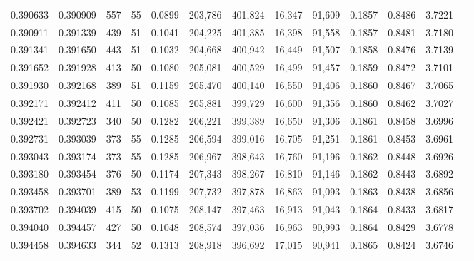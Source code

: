 \begin{tabular}{rrrrrrrrrrrrr}
0.390633 & 0.390909 &   557 &  55 &                                     0.0899 & 203,786 & 401,824 &  16,347 &  91,609 & 0.1857 & 0.8486 & 3.7221 \\
0.390911 & 0.391339 &   439 &  51 &                                     0.1041 & 204,225 & 401,385 &  16,398 &  91,558 & 0.1857 & 0.8481 & 3.7180 \\
0.391341 & 0.391650 &   443 &  51 &                                     0.1032 & 204,668 & 400,942 &  16,449 &  91,507 & 0.1858 & 0.8476 & 3.7139 \\
0.391652 & 0.391928 &   413 &  50 &                                     0.1080 & 205,081 & 400,529 &  16,499 &  91,457 & 0.1859 & 0.8472 & 3.7101 \\
0.391930 & 0.392168 &   389 &  51 &                                     0.1159 & 205,470 & 400,140 &  16,550 &  91,406 & 0.1860 & 0.8467 & 3.7065 \\
0.392171 & 0.392412 &   411 &  50 &                                     0.1085 & 205,881 & 399,729 &  16,600 &  91,356 & 0.1860 & 0.8462 & 3.7027 \\
0.392421 & 0.392723 &   340 &  50 &                                     0.1282 & 206,221 & 399,389 &  16,650 &  91,306 & 0.1861 & 0.8458 & 3.6996 \\
0.392731 & 0.393039 &   373 &  55 &                                     0.1285 & 206,594 & 399,016 &  16,705 &  91,251 & 0.1861 & 0.8453 & 3.6961 \\
0.393043 & 0.393174 &   373 &  55 &                                     0.1285 & 206,967 & 398,643 &  16,760 &  91,196 & 0.1862 & 0.8448 & 3.6926 \\
0.393180 & 0.393454 &   376 &  50 &                                     0.1174 & 207,343 & 398,267 &  16,810 &  91,146 & 0.1862 & 0.8443 & 3.6892 \\
0.393458 & 0.393701 &   389 &  53 &                                     0.1199 & 207,732 & 397,878 &  16,863 &  91,093 & 0.1863 & 0.8438 & 3.6856 \\
0.393702 & 0.394039 &   415 &  50 &                                     0.1075 & 208,147 & 397,463 &  16,913 &  91,043 & 0.1864 & 0.8433 & 3.6817 \\
0.394040 & 0.394457 &   427 &  50 &                                     0.1048 & 208,574 & 397,036 &  16,963 &  90,993 & 0.1864 & 0.8429 & 3.6778 \\
0.394458 & 0.394633 &   344 &  52 &                                     0.1313 & 208,918 & 396,692 &  17,015 &  90,941 & 0.1865 & 0.8424 & 3.6746 \\

\end{tabular}
